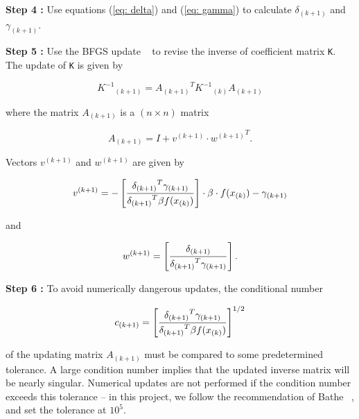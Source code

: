 \vspace{0.15 in}\noindent
{\bf Step 4 :}
Use equations (\ref{eq: delta}) and (\ref{eq: gamma}) to
calculate $\delta_{(k+1)}$ and $\gamma_{(k+1)}$.

\vspace{0.15 in}\noindent
{\bf Step 5 :}
Use the BFGS update ~\cite{bathe80} to revise
the inverse of coefficient matrix {\tt K}.
The update of {\tt K} is given by

\begin{equation}
 {K^{-1}}_{(k+1)} = {A_{(k+1)}}^T{K^{-1}}_{(k)} A_{(k+1)}
\label{eq: BFGS-3}
\end{equation}

\noindent
where the matrix $A_{(k+1)}$ is a $(n \times n)$ matrix 

\begin{equation}
A_{(k+1)} = I + v^{(k+1)} \cdot {w^{(k+1)}}^T.
\label{eq: BFGS-4}
\end{equation}

\noindent
Vectors $v^{(k+1)}$ and $w^{(k+1)}$ are given by

\begin{equation}
v^{(k+1)} = - \left [ {{\delta_{(k+1)}}^T \gamma_{(k+1)} } \over { {\delta_{(k+1)}}^T \beta f(x_{(k)})}\right ] 
        \cdot \beta \cdot f(x_{(k)}) - \gamma_{(k+1)}
\label{eq: BFGS-5}
\end{equation}

\noindent
and

\begin{equation}
w^{(k+1)} = \left[ {{\delta_{(k+1)}} \over { {\delta_{(k+1)}}^T \gamma_{(k+1)}}} \right].
\label{eq: BFGS-6}
\end{equation}

\vspace{0.15 in}\noindent
{\bf Step 6 :}
To avoid numerically dangerous updates,
the conditional number

\begin{equation}
c_{(k+1)} = \left [ {{\delta_{(k+1)}}^T \gamma_{(k+1)}} \over { {\delta_{(k+1)}}^T \beta f(x_{(k)})} \right ]^{1/2}
\label{eq: BFGS-7}
\end{equation}

\vspace{0.15 in}\noindent
of the updating matrix $A_{(k+1)}$ 
must be compared to some predetermined tolerance.
A large condition number implies that the updated inverse matrix
will be nearly singular.
Numerical updates are not performed if the
condition number exceeds this tolerance -- in this project,
we follow the recommendation of Bathe ~\cite{bathe80},
and set the tolerance at $10^5$.

